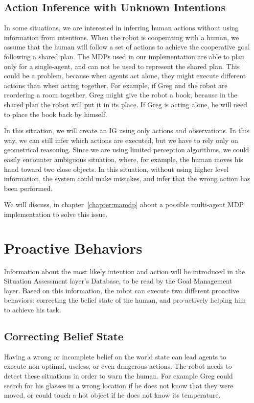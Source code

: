 \subsection{Action Inference with Unknown Intentions}
\label{subsec:intention-unknown_intentions}
In some situations, we are interested in inferring human actions without using information from intentions. When the robot is cooperating with a human, we assume that the human will follow a set of actions to achieve the cooperative goal following a shared plan. The MDPs used in our implementation are able to plan only for a single-agent, and can not be used to represent the shared plan. This could be a problem, because when agents act alone, they might execute different actions than when acting together. For example, if Greg and the robot are reordering a room together, Greg might give the robot a book, because in the shared plan the robot will put it in its place. If Greg is acting alone, he will need to place the book back by himself.  

In this situation, we will create an IG using only actions and observations. In this way, we can still infer which actions are executed, but we have to rely only on geometrical reasoning. Since we are using limited perception algorithms, we could easily encounter ambiguous situation, where, for example, the human moves his hand toward two close objects. In this situation, without using higher level information, the system could make mistakes, and infer that the wrong action has been performed.

We will discuss, in chapter~\ref{chapter:mamdp} about a possible multi-agent MDP implementation to solve this issue.

\section{Proactive Behaviors}
\label{sec:intention-proactive_behaviors}
Information about the most likely intention and action will be introduced in the Situation Assessment layer's Database, to be read by the Goal Management layer. Based on this information, the robot can execute two different proactive behaviors: correcting the belief state of the human, and pro-actively helping him to achieve his task.

\subsection{Correcting Belief State}
Having a wrong or incomplete belief on the world state can lead agents to execute non optimal, useless, or even dangerous actions. The robot needs to detect these situations in order to warn the human. For example Greg could search for his glasses in a wrong location if he does not know that they were moved, or could touch a hot object if he does not know its temperature.

